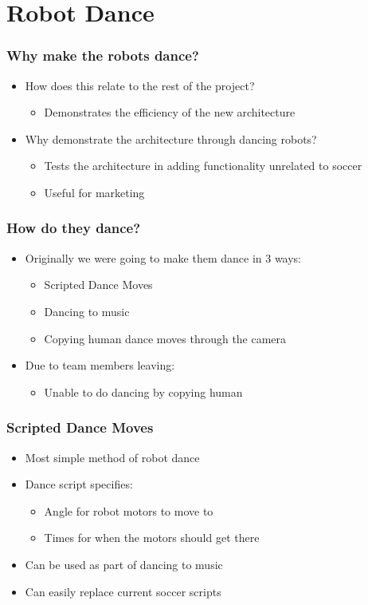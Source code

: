 \documentclass{beamer}
\begin{document}
\section{Robot Dance}
	\begin{frame}
		\sectionpage %
	\end{frame}
	\begin{frame}
		\frametitle{Why make the robots dance?}
		\begin{itemize}
			\item How does this relate to the rest of the project?
			\begin{itemize}
				\item Demonstrates the efficiency of the new architecture
			\end{itemize}
			\item Why demonstrate the architecture through dancing robots?
			\begin{itemize}
				\item Tests the architecture in adding functionality unrelated to soccer
				\item Useful for marketing
			\end{itemize}
		\end{itemize}
	\end{frame}
	\begin{frame}
		\frametitle{How do they dance?}
		\begin{itemize}
			\item Originally we were going to make them dance in 3 ways:
			\begin{itemize}
				\item Scripted Dance Moves
				\item Dancing to music
				\item Copying human dance moves through the camera
			\end{itemize}
			\item Due to team members leaving:
			\begin{itemize}
				\item Unable to do dancing by copying human
			\end{itemize}
		\end{itemize}
	\end{frame}
	\begin{frame}
		\frametitle{Scripted Dance Moves}
		\begin{itemize}
			\item Most simple method of robot dance
			\item Dance script specifies:
			\begin{itemize}
				\item Angle for robot motors to move to
				\item Times for when the motors should get there
			\end{itemize}
			\item Can be used as part of dancing to music
			\item Can easily replace current soccer scripts
		\end{itemize}
	\end{frame}	
\end{document}
